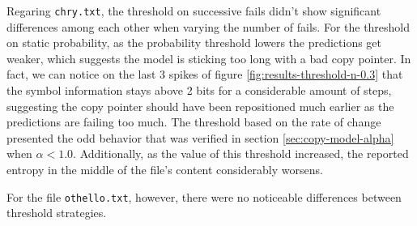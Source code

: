 \documentclass{article}
\begin{document}
Regaring \verb|chry.txt|, the threshold on successive fails didn't show significant differences among each other when varying the number of fails.
For the threshold on static probability, as the probability threshold lowers the predictions get weaker, which suggests the model is sticking too long with a bad copy pointer.
In fact, we can notice on the last 3 spikes of figure \ref{fig:results-threshold-n-0.3} that the symbol information stays above 2 bits for a considerable amount of steps, suggesting the copy pointer should have been repositioned much earlier as the predictions are failing too much.
The threshold based on the rate of change presented the odd behavior that was verified in section \ref{sec:copy-model-alpha} when $\alpha < 1.0$.
Additionally, as the value of this threshold increased, the reported entropy in the middle of the file's content considerably worsens.

For the file \verb|othello.txt|, however, there were no noticeable differences between threshold strategies.
\end{document}
